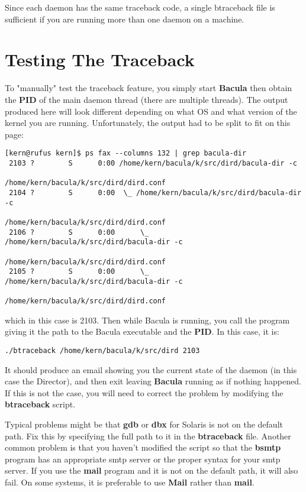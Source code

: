 Since each daemon has the same traceback code, a single btraceback file is
sufficient if you are running more than one daemon on a machine. 

\section{Testing The Traceback}

To "manually" test the traceback feature, you simply start {\bf Bacula} then
obtain the {\bf PID} of the main daemon thread (there are multiple threads).
The output produced here will look different depending on what OS and what
version of the kernel you are running.
Unfortunately, the output had to be split to fit on this page: 

\footnotesize
\begin{verbatim}
[kern@rufus kern]$ ps fax --columns 132 | grep bacula-dir
 2103 ?        S      0:00 /home/kern/bacula/k/src/dird/bacula-dir -c
                                       /home/kern/bacula/k/src/dird/dird.conf
 2104 ?        S      0:00  \_ /home/kern/bacula/k/src/dird/bacula-dir -c
                                       /home/kern/bacula/k/src/dird/dird.conf
 2106 ?        S      0:00      \_ /home/kern/bacula/k/src/dird/bacula-dir -c
                                       /home/kern/bacula/k/src/dird/dird.conf
 2105 ?        S      0:00      \_ /home/kern/bacula/k/src/dird/bacula-dir -c
                                       /home/kern/bacula/k/src/dird/dird.conf
\end{verbatim}
\normalsize

which in this case is 2103. Then while Bacula is running, you call the program
giving it the path to the Bacula executable and the {\bf PID}. In this case,
it is: 

\footnotesize
\begin{verbatim}
./btraceback /home/kern/bacula/k/src/dird 2103
\end{verbatim}
\normalsize

It should produce an email showing you the current state of the daemon (in
this case the Director), and then exit leaving {\bf Bacula} running as if
nothing happened. If this is not the case, you will need to correct the
problem by modifying the {\bf btraceback} script. 

Typical problems might be that {\bf gdb} or {\bf dbx} for Solaris is not on
the default path.  Fix this by specifying the full path to it in the {\bf
btraceback} file.  Another common problem is that you haven't modified the
script so that the {\bf bsmtp} program has an appropriate smtp server or
the proper syntax for your smtp server.  If you use the {\bf mail} program
and it is not on the default path, it will also fail.  On some systems, it
is preferable to use {\bf Mail} rather than {\bf mail}.

